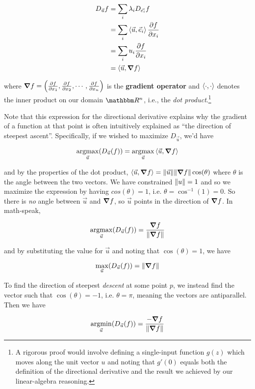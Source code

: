 \documentclass[../main/main.tex]{subfiles}
\begin{document}
\[\begin{split}
  D_{\vec{u}}f &= \sum_i \lambda_i D_{\vec{e_i}}f \\
      &= \sum_i \left<\vec{u},\vec{e}_i\right> \pdv{f}{x_i} \\
      &= \sum_i u_i \pdv{f}{x_i} \\
      &= \left<\vec{u},\grad{f}\right>
\end{split}
\]

where 
\(\grad{f} = \left(\pdv{f}{x_1}, \pdv{f}{x_2}, \cdots, \pdv{f}{x_n}\right)\)
is the \textbf{gradient operator} and 
\(\left<\cdot,\cdot\right>\) denotes the inner product
on our domain \(\domain{R}^n\), i.e.,
the \emph{dot product}.\footnote
{
A rigorous proof would involve defining a single-input function
\(g(z)\) which moves along the unit vector \(u\) and
noting that \(g'(0)\) equals both the definition of the
directional derivative and the result we achieved by our
linear-algebra reasoning.
}\par

Note that this expression for the directional derivative
explains why the gradient of a function at that point is
often intuitively explained as 
``the direction of steepest ascent''. Specifically,
if we wished to maximize \(D_{\vec{u}}\), we'd have

\[
  \operatorname*{argmax}_{\vec{u}}(D_{\vec{u}}(f)) 
  = \operatorname*{argmax}_{\vec{u}}\left<\vec{u},\grad{f}\right>
\]

and by the properties of the dot product,
\(\left<\vec{u},\grad{f}\right> = 
\norm{\vec{u}}\norm{\grad{f}}\cos(\theta)\) where
\(\theta\) is the angle between the two vectors.
We have constrained \(\norm{u} = 1\) and so we
maximize the expression by having \(cos(\theta) = 1\), 
i.e. \(\theta = \cos^{-1}(1) = 0\).
So there is \emph{no} angle between \(\vec{u}\)
and \(\grad{f}\), so \(\vec{u}\) points in the direction
of \(\grad{f}\). In math-speak,

\[
  \operatorname*{argmax}_{\vec{u}}(D_{\vec{u}}(f)) 
  = \frac{\grad{f}}{\norm{\grad{f}}}
\]

and by substituting the value for \(\vec{u}\)
and noting that \(\cos(\theta) = 1\), we have

\[
  \max_{\vec{u}}(D_{\vec{u}}(f)) 
  = \norm{\grad{f}}
\]

To find the direction of steepest \emph{descent} at 
some point \(p\),
we instead find the vector such that \(\cos(\theta) = -1\),
i.e. \(\theta = \pi\), meaning the vectors are antiparallel.
Then we have

\[
  \operatorname*{argmin}_{\vec{u}}(D_{\vec{u}}(f)) 
  = \frac{-\grad{f}}{\norm{\grad{f}}}
\]
\end{document}
